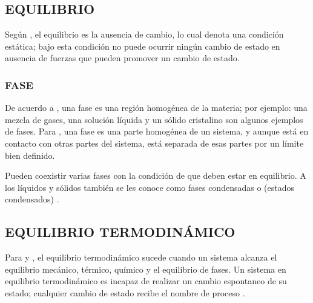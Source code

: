 

\subsection{EQUILIBRIO}
  Según \parencite[p. 29]{Smith.VanNess.Abbott2007}, el equilibrio es la ausencia de cambio, lo cual denota una condición estática; bajo esta condición no puede ocurrir ningún cambio de estado en ausencia de fuerzas que pueden promover un cambio de estado.

\subsubsection{FASE}
    De acuerdo a \parencite[p. 30]{Smith.VanNess.Abbott2007}, una fase es una región homogénea de la materia; por ejemplo: una mezcla de gases, una solución líquida y un sólido cristalino son algunos ejemplos de fases. Para \parencite[p. 461]{ChangQmc2010}, una fase es una parte homogénea de un sistema, y aunque está en contacto con otras partes del sistema, está separada de esas partes por un límite bien definido.
    
    Pueden coexistir varias fases con la condición de que deben estar en equilibrio. A los líquidos y sólidos también se les conoce como fases condensadas o (estados condensados) \parencite[p. 430]{SilberberglQmcGeneral}. 


\subsection{EQUILIBRIO TERMODINÁMICO}
Para \parencite{Reisel2021} y \parencite{YunusA.Cengel2015}, el equilibrio termodinámico sucede cuando un sistema alcanza el equilibrio mecánico, térmico, químico y el equilibrio de fases.
Un sistema en equilibrio termodinámico es incapaz de realizar un cambio espontaneo de su estado; cualquier cambio de estado recibe el nombre de proceso \parencite[p. 39]{YunusA.Cengel2015}.

